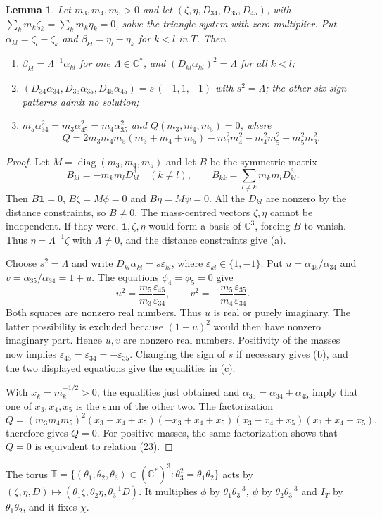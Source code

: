 \documentclass[Threeside,11pt]{article}
\newtheorem{lemma}[theorem]{Lemma}
\theoremstyle{definition}
\theoremstyle{remark}
\numberwithin{equation}{section}
\newcommand{\C}{\mathbb C}\newcommand{\T}{\mathbb T}
\theoremstyle{remark}
\newenvironment{alphalist}{\begin{enumerate}\renewcommand{\labelenumi}{(\alph{enumi})}%
  \renewcommand{\theenumi}{\alph{enumi}}}{\end{enumerate}}
\begin{document}
{\begin{lemma}\label{lem:d1-shape}
Let $m_3,m_4,m_5>0$ and let $(\zeta,\eta,D_{34},D_{35},D_{45})$, with
$\sum_km_k\zeta_k=\sum_km_k\eta_k=0$, solve the triangle system with zero multiplier.  Put
$\alpha_{kl}=\zeta_l-\zeta_k$ and $\beta_{kl}=\eta_l-\eta_k$ for $k<l$ in $T$.  Then
\begin{alphalist}
  \item $\beta_{kl}=\Lambda^{-1}\alpha_{kl}$ for one $\Lambda\in\C^*$, and $(D_{kl}\alpha_{kl})^2=
  \Lambda$ for all $k<l$;
  \item $(D_{34}\alpha_{34},D_{35}\alpha_{35},D_{45}\alpha_{45})=s\,(-1,1,-1)$ with $s^2=\Lambda$;
  the other six sign patterns admit no solution;
  \item $m_5\alpha_{34}^2=m_3\alpha_{45}^2=m_4\alpha_{35}^2$ and $Q(m_3,m_4,m_5)=0$, where
  \[
    Q=2m_3m_4m_5(m_3+m_4+m_5)-m_3^2m_4^2-m_4^2m_5^2-m_5^2m_3^2 .
  \]
\end{alphalist}
\end{lemma}}
{\begin{proof}
Let $M=\operatorname{diag}(m_3,m_4,m_5)$ and let $B$ be the symmetric matrix
\[
 B_{kl}=-m_km_lD_{kl}^3\quad(k\ne l),\qquad
 B_{kk}=\sum_{l\ne k}m_km_lD_{kl}^3.
\]
Then $B\mathbf1=0$, $B\zeta=M\phi=0$ and $B\eta=M\psi=0$.
All the $D_{kl}$ are nonzero by the distance constraints, so $B\ne0$.
The mass-centred vectors $\zeta,\eta$ cannot be independent.
If they were, $\mathbf1,\zeta,\eta$ would form a basis of $\C^3$, forcing $B$ to vanish.
Thus $\eta=\Lambda^{-1}\zeta$ with $\Lambda\ne0$, and the distance constraints give (a).

Choose $s^2=\Lambda$ and write $D_{kl}\alpha_{kl}=s\varepsilon_{kl}$,
where $\varepsilon_{kl}\in\{1,-1\}$.  Put
$u=\alpha_{45}/\alpha_{34}$ and $v=\alpha_{35}/\alpha_{34}=1+u$.
The equations $\phi_4=\phi_5=0$ give
\[
 u^2=\frac{m_5}{m_3}\frac{\varepsilon_{45}}{\varepsilon_{34}},
 \qquad
 v^2=-\frac{m_5}{m_4}\frac{\varepsilon_{35}}{\varepsilon_{34}}.
\]
Both squares are nonzero real numbers.  Thus $u$ is real or purely imaginary.
The latter possibility is excluded because $(1+u)^2$ would then have nonzero
imaginary part.  Hence $u,v$ are nonzero real numbers.  Positivity of the masses now implies
$\varepsilon_{45}=\varepsilon_{34}=-\varepsilon_{35}$.  Changing the sign
of $s$ if necessary gives (b), and the two displayed equations give the
equalities in (c).

With $x_k=m_k^{-1/2}>0$, the equalities just obtained and
$\alpha_{35}=\alpha_{34}+\alpha_{45}$ imply that one of $x_3,x_4,x_5$
is the sum of the other two.  The factorization
\[
 Q=(m_3m_4m_5)^2(x_3+x_4+x_5)(-x_3+x_4+x_5)
       (x_3-x_4+x_5)(x_3+x_4-x_5),
\]
therefore gives $Q=0$.  For positive masses, the same factorization shows that
$Q=0$ is equivalent to relation (23).
\end{proof}

}The torus $\mathbb T=\{(\theta_1,\theta_2,\theta_3)\in(\C^*)^3:\theta_3^2=\theta_1\theta_2\}$ acts by
$(\zeta,\eta,D)\mapsto(\theta_1\zeta,\theta_2\eta,\theta_3^{-1}D)$.  It multiplies $\phi$ by
$\theta_1\theta_3^{-3}$, $\psi$ by $\theta_2\theta_3^{-3}$ and $I_T$ by $\theta_1\theta_2$, and it
fixes $\chi$.
\end{document}
